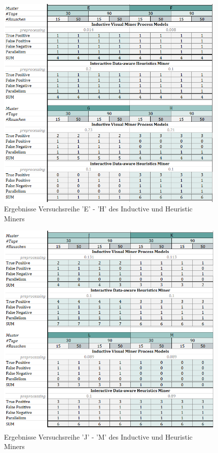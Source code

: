 \begin{figure}[!ht]
    \centering
    \includegraphics[width=\textwidth]{figures/Appbildungen/tab2.PNG}
    \caption{Ergebnisse Versuchsreihe 'E' - 'H' des Inductive und Heuristic Miners}
    \label{tab2}
\end{figure}

\begin{figure}[!ht]
    \centering
    \includegraphics[width=\textwidth]{figures/Appbildungen/tab3.PNG}
    \caption{Ergebnisse Versuchsreihe 'J' - 'M' des Inductive und Heuristic Miners}
    \label{tab3}
\end{figure}

